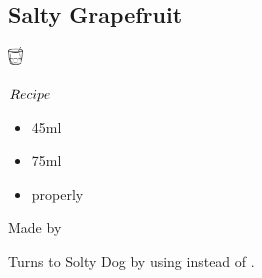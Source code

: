 \subsection{Salty Grapefruit}
\vspace{-7mm}
\hspace{45mm}
\includegraphics[width=4mm]{cocktail_glass_rock.png}
\vspace{2.5mm}
\begin{itembox}[l]{\boldmath $Recipe$}
\begin{itemize}
\setlength{\parskip}{0cm}
\setlength{\itemsep}{0cm}
\item \sake 45ml
\item \gj 75ml
\item \salt properly
\end{itemize}
\vspace{-4mm}
Made by \stir
\end{itembox}
Turns to Solty Dog by using \vodka instead of \sake
\hspace{-1mm}.
